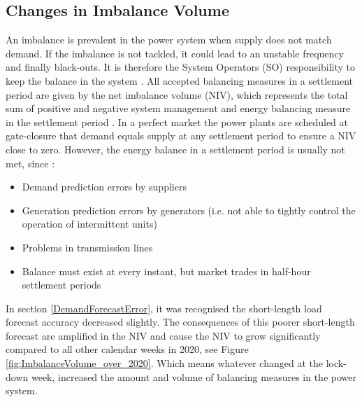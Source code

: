 \documentclass[energies,article,submit,moreauthors,pdftex]{Definitions/mdpi}
\begin{document}


\subsection{Changes in Imbalance Volume}\label{section:ImbalanceVolume}

An imbalance is prevalent in the power system when supply does not match demand. If the imbalance is not tackled, it could lead to an unstable frequency and finally black-outs. It is therefore the System Operators (SO) responsibility to keep the balance in the system \cite{ELEXON2020ELEXONBMRS}. All accepted balancing measures in a settlement period are given by the net imbalance volume (NIV), which represents the total sum of positive and negative system management and energy balancing measure in the settlement period \cite{ELEXON2020ELEXONBMRS}. In a perfect market the power plants are scheduled at gate-closure that demand equals supply at any settlement period to ensure a NIV close to zero. However, the energy balance in a settlement period is usually not met, since \cite{ELEXON2019GuidanceBritain}:
\begin{itemize}
    \item Demand prediction errors by suppliers
    \item Generation prediction errors by generators (i.e. not able to tightly control the operation of intermittent units)
    \item Problems in transmission lines
    \item Balance must exist at every instant, but market trades in half-hour settlement periods 
\end{itemize}

In section \ref{DemandForecastError}, it was recognised the short-length load forecast accuracy decreased slightly. The consequences of this poorer short-length forecast are amplified in the NIV and cause the NIV to grow significantly compared to all other calendar weeks in 2020, see Figure \ref{fig:ImbalanceVolume_over_2020}. Which means whatever changed at the lock-down week, increased the amount and volume of balancing measures in the power system.
\end{document}
